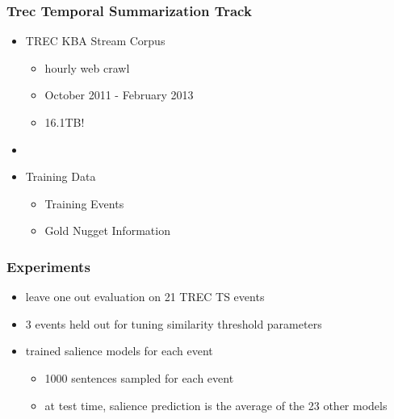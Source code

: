 \documentclass{beamer}
\begin{document}
\begin{frame}
\frametitle{Trec Temporal Summarization Track}
\begin{itemize}
\item TREC KBA Stream Corpus
\begin{itemize}
\item hourly web crawl
\item October 2011 - February 2013
\item 16.1TB!
\end{itemize}
\item[]
\item Training Data
\begin{itemize}
\item Training Events
\item Gold Nugget Information
\end{itemize}
\end{itemize}
\end{frame}




\begin{frame}
    \frametitle{Experiments}
    
    \begin{itemize}
        \pause
        \item leave one out evaluation on 21 TREC TS events
        \pause
        \item 3 events held out for tuning similarity threshold parameters
        \pause
        \item trained salience models for each event
        \pause
        \begin{itemize}
            \item 1000 sentences sampled for each event
            \item at test time, salience prediction is the average of the 
                23 other models
        \end{itemize}
    \end{itemize}
    
\end{frame}
\end{document}
